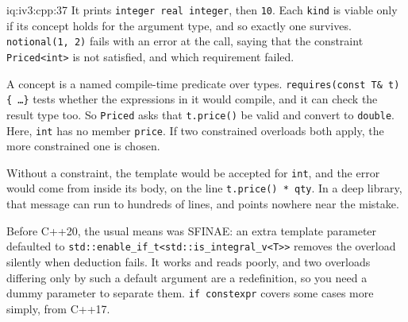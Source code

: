 \begin{solution}{iq:iv3:cpp:37}
It prints \texttt{integer real integer}, then \texttt{10}. Each \texttt{kind} is viable only if its concept holds for the argument type, and so exactly one survives. \texttt{notional(1, 2)} fails with an error at the call, saying that the constraint \texttt{Priced<int>} is not satisfied, and which requirement failed.

A concept is a named compile-time predicate over types. \texttt{requires(const T\& t) \{ \dots \}} tests whether the expressions in it would compile, and it can check the result type too. So \texttt{Priced} asks that \texttt{t.price()} be valid and convert to \texttt{double}. Here, \texttt{int} has no member \texttt{price}. If two constrained overloads both apply, the more constrained one is chosen.

Without a constraint, the template would be accepted for \texttt{int}, and the error would come from inside its body, on the line \texttt{t.price() * qty}. In a deep library, that message can run to hundreds of lines, and points nowhere near the mistake.

Before C++20, the usual means was SFINAE: an extra template parameter defaulted to \texttt{std::enable\_if\_t<std::is\_integral\_v<T>{}>} removes the overload silently when deduction fails. It works and reads poorly, and two overloads differing only by such a default argument are a redefinition, so you need a dummy parameter to separate them. \texttt{if constexpr} covers some cases more simply, from C++17.

\end{solution}

